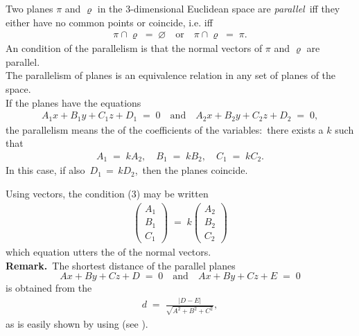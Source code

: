 \documentclass[12pt]{article}
\theoremstyle{definition}
\begin{document}
Two planes $\pi$ and $\varrho$ in the 3-dimensional Euclidean space are {\em parallel}\, iff they either have no common points or coincide, i.e. iff
\begin{align}
\pi\cap\varrho \;=\; \varnothing \quad \mbox{or} \quad \pi\cap\varrho\;=\; \pi.
\end{align}
An  condition of the parallelism is that the normal vectors of $\pi$ and $\varrho$ are parallel.\\
The parallelism of planes is an equivalence relation in any set of planes of the space.\\

If the planes have the equations
\begin{align}
A_1x\!+\!B_1y\!+\!C_1z\!+\!D_1 \;=\; 0 \quad \mbox{and} \quad A_2x\!+\!B_2y\!+\!C_2z\!+\!D_2 \;=\; 0,
\end{align}
the parallelism means the  of the coefficients of the variables:\, there exists a  $k$ such that
\begin{align}
A_1 \;=\; kA_2, \quad B_1 \;=\; kB_2, \quad C_1 \;=\; kC_2.
\end{align}
In this case, if also\, $D_1 \,=\, kD_2$,\, then the planes coincide.

Using vectors, the condition (3) may be written
\begin{align}
       \left(\!\begin{array}{c}A_1\\ B_1\\ C_1\end{array}\!\right) 
\;=\; k\left(\!\begin{array}{c}A_2\\ B_2\\ C_2\end{array}\!\right)
\end{align}
which equation utters the  of the normal vectors.\\


\textbf{Remark.}\, The shortest distance of the parallel planes 
$$Ax\!+\!By\!+\!Cz\!+\!D \;=\; 0 \quad \mbox{and} \quad Ax\!+\!By\!+\!Cz\!+\!E \;=\; 0$$
is obtained from the 
\begin{align}
d \;=\; \frac{|D\!-\!E|}{\sqrt{A^2\!+\!B^2\!+\!C^2}},
\end{align}
as is easily shown by using  (see ).

\end{document}
